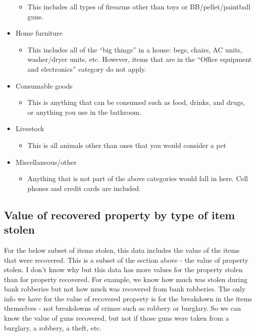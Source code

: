 \documentclass[
  12pt,
  openany]{book}
\providecommand{\tightlist}{%
  \setlength{\itemsep}{0pt}\setlength{\parskip}{0pt}}
\begin{document}
\begin{itemize}
  \begin{itemize}
  \tightlist
  \item
    This includes all types of firearms other than toys or BB/pellet/paintball guns.
  \end{itemize}
\item
  Home furniture

  \begin{itemize}
  \tightlist
  \item
    This includes all of the ``big things'' in a house: begs, chairs, AC units, washer/dryer units, etc. However, items that are in the ``Office equipment and electronics'' category do not apply.
  \end{itemize}
\item
  Consumable goods

  \begin{itemize}
  \tightlist
  \item
    This is anything that can be consumed such as food, drinks, and drugs, or anything you use in the bathroom.
  \end{itemize}
\item
  Livestock

  \begin{itemize}
  \tightlist
  \item
    This is all animals other than ones that you would consider a pet
  \end{itemize}
\item
  Miscellaneous/other

  \begin{itemize}
  \tightlist
  \item
    Anything that is not part of the above categories would fall in here. Cell phones and credit cards are included.
  \end{itemize}
\end{itemize}

\hypertarget{value-of-recovered-property-by-type-of-item-stolen}{%
\subsection{Value of recovered property by type of item stolen}\label{value-of-recovered-property-by-type-of-item-stolen}}

For the below subset of items stolen, this data includes the value of the items that were recovered. This is a subset of the section above - the value of property stolen. I don't know why but this data has more values for the property stolen than for property recovered. For example, we know how much was stolen during bank robberies but not how much was recovered from bank robberies. The only info we have for the value of recovered property is for the breakdown in the items themselves - not breakdowns of crimes such as robbery or burglary. So we can know the value of guns recovered, but not if those guns were taken from a burglary, a robbery, a theft, etc.
\end{document}

